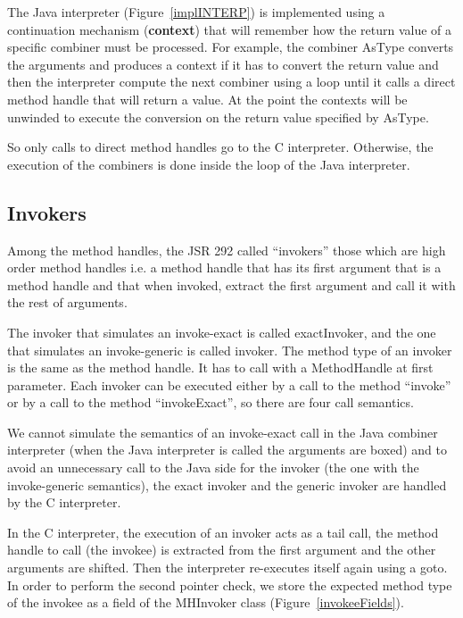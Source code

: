 \documentclass{sig-alternate}
\def \Jsr{JSR\xspace}
\def \JSR{\Jsr 292\xspace}
\begin{document}
      The Java interpreter (Figure~\ref{implINTERP}) is implemented using a continuation mechanism
      ({\bf context}) that will remember how the return value of a specific combiner must be processed.
      For example, the combiner AsType converts the arguments and produces a context if it has
      to convert the return value and then the interpreter compute the next combiner using a loop until it calls
      a direct method handle that will return a value. At the point the contexts will be unwinded
      to execute the conversion on the return value specified by AsType. 

      So only calls to direct method handles go to the C interpreter.
      Otherwise, the execution of the combiners is done inside the loop of the Java interpreter.

    \subsection{Invokers}
     \label{invokers}

      Among the method handles, the \JSR called ``invokers'' those which are high order method handles i.e.
      a method handle that has its first argument that is a method handle and that when invoked,
      extract the first argument and call it with the rest of arguments.

      The invoker that simulates an invoke-exact is called exactInvoker, and the one that simulates
      an invoke-generic is called invoker. The method type of an invoker is the same as the method handle.
      It has to call with a MethodHandle at first parameter.
      Each invoker can be executed either by a call to the method ``invoke'' or by a call to the method ``invokeExact'',
      so there are four call semantics.
      
      We cannot simulate the semantics of an invoke-exact call in the Java combiner interpreter
      (when the Java interpreter is called the arguments are boxed) and to avoid an unnecessary call to the Java side
      for the invoker (the one with the invoke-generic semantics), the exact invoker and the generic invoker
      are handled by the C interpreter.
      
      In the C interpreter, the execution of an invoker acts as a tail call,
      the method handle to call (the invokee) is extracted from the first argument and the other arguments are shifted.
      Then the interpreter re-executes itself again using a goto.
      In order to perform the second pointer check, we store the expected method type of the invokee as a field of the MHInvoker class
      (Figure~\ref{invokeeFields}).
\end{document}
